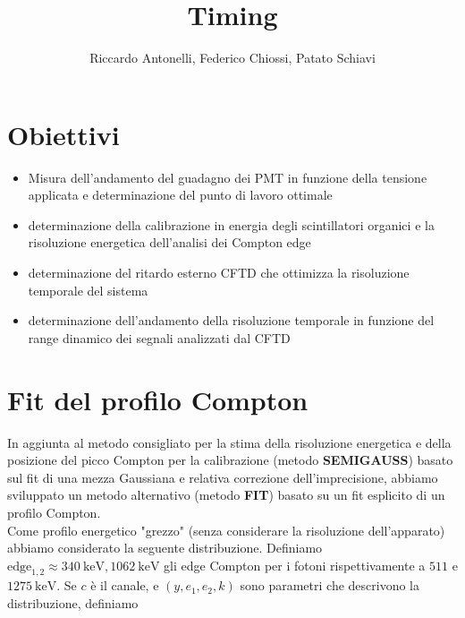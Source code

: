 \documentclass[10pt,a4paper]{article}
\begin{document}
\author{Riccardo Antonelli, Federico Chiossi, Patato Schiavi}
\title{Timing}

\maketitle

\section{Obiettivi}


\begin{itemize}

\item Misura dell'andamento del guadagno dei PMT in funzione della tensione applicata e determinazione del punto di lavoro ottimale
\item determinazione della calibrazione in energia degli scintillatori organici e la risoluzione energetica dell'analisi dei Compton edge
\item determinazione del ritardo esterno CFTD che ottimizza la risoluzione temporale del sistema
\item determinazione dell'andamento della risoluzione temporale in funzione del range dinamico dei segnali analizzati dal CFTD

\end{itemize}

\section{Fit del profilo Compton}

In aggiunta al metodo consigliato per la stima della risoluzione energetica e della posizione del picco Compton per la calibrazione (metodo \textbf{SEMIGAUSS}) basato sul fit di una mezza Gaussiana e relativa correzione dell'imprecisione, abbiamo sviluppato un metodo alternativo (metodo \textbf{FIT}) basato su un fit esplicito di un profilo Compton.\\

Come profilo energetico "grezzo" (senza considerare la risoluzione dell'apparato) abbiamo considerato la seguente distribuzione. Definiamo $\text{edge}_{1,2} \approx \SI{340}{\kilo\electronvolt}, \SI{1062}{\kilo\electronvolt}$ gli edge Compton per i fotoni rispettivamente a $511$ e $\SI{1275}{\kilo\electronvolt}$. Se $c$ è il canale, e $(y,e_1,e_2,k)$ sono parametri che descrivono la distribuzione, definiamo
\end{document}
